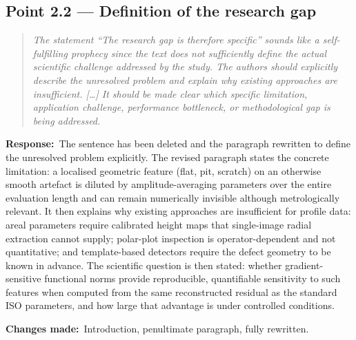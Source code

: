 \documentclass[11pt,a4paper]{article}
\newenvironment{reviewercomment}%
{\par\medskip\noindent\begin{quotation}\itshape\color{black!70}}%
{\end{quotation}\medskip}
\newcommand{\response}{\par\noindent\textbf{Response:}\ }
\newcommand{\changes}{\par\noindent\textbf{Changes made:}\ }
\begin{document}
\subsection*{Point 2.2 --- Definition of the research gap}
\begin{reviewercomment}
The statement ``The research gap is therefore specific'' sounds like a self-fulfilling prophecy since the text does not sufficiently define the actual scientific challenge addressed by the study. The authors should explicitly describe the unresolved problem and explain why existing approaches are insufficient. [\ldots] It should be made clear which specific limitation, application challenge, performance bottleneck, or methodological gap is being addressed.
\end{reviewercomment}
\response The sentence has been deleted and the paragraph rewritten to define the unresolved problem explicitly. The revised paragraph states the concrete limitation: a localised geometric feature (flat, pit, scratch) on an otherwise smooth artefact is diluted by amplitude-averaging parameters over the entire evaluation length and can remain numerically invisible although metrologically relevant. It then explains why existing approaches are insufficient for profile data: areal parameters require calibrated height maps that single-image radial extraction cannot supply; polar-plot inspection is operator-dependent and not quantitative; and template-based detectors require the defect geometry to be known in advance. The scientific question is then stated: whether gradient-sensitive functional norms provide reproducible, quantifiable sensitivity to such features when computed from the same reconstructed residual as the standard ISO parameters, and how large that advantage is under controlled conditions.
\changes Introduction, penultimate paragraph, fully rewritten.
\end{document}
